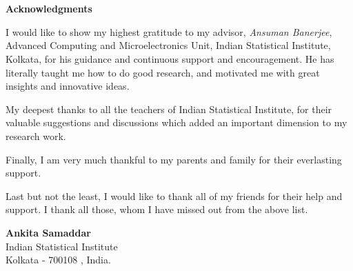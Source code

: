 \chapter*{}
\thispagestyle{empty}
\begin{center}
\vspace{-1.9in}
\parskip=0.1in
{\Large \bf Acknowledgments} 
\end{center}
\vspace{.1in}
\vspace{.2in}

\noindent
I would like to show my highest gratitude to my advisor, \emph{Ansuman Banerjee}, Advanced Computing and Microelectronics Unit, Indian
Statistical Institute, Kolkata, for his guidance and continuous support and encouragement.
He has literally taught me how to do good research, and motivated me with great insights and innovative ideas.

\vspace{2.5mm}
\noindent
My deepest thanks to all the teachers of Indian Statistical Institute, for their valuable
suggestions and discussions which added an important dimension to my research work.

\vspace{2.5mm}
\noindent
Finally, I am very much thankful to my parents and family for their everlasting support.

\vspace{2.5mm}
\noindent
Last but not the least, I would like to thank all of my friends for their help and support. I thank all those, 
whom I have missed out from the above list.


\vspace{.3in}
\begin{flushright}
{\bf Ankita Samaddar}\\
Indian Statistical Institute\\
Kolkata - 700108 , India. 
\end{flushright}
